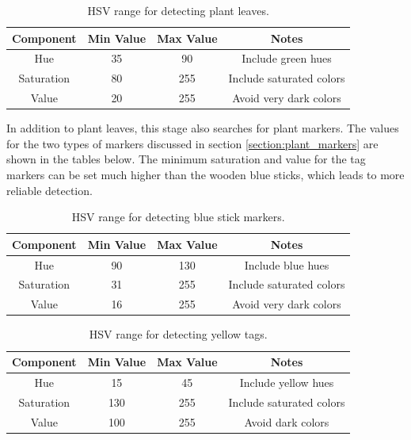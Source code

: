 \begin{table}
    \begin{center}
    \caption[Plant Leaf Detection Values]{HSV range for detecting plant leaves.}
    \begin{tabular}[c]{|c|c|c|c|}
        \hline
        Component & Min Value & Max Value & Notes \\
        \hline
        Hue        & 35  & 90  & Include green hues        \\
        Saturation & 80  & 255 & Include saturated colors  \\
        Value      & 20  & 255 & Avoid very dark colors    \\
        \hline
    \end{tabular}
    \label{table:plant_leaves_hsv_ranges}
   \end{center}
\end{table}

In addition to plant leaves, this stage also searches for plant markers.  The values for the two types of markers discussed in section \ref{section:plant_markers} are shown in the tables below.  The minimum saturation and value for the tag markers can be set much higher than the wooden blue sticks, which leads to more reliable detection.   

\begin{table}
    \begin{center}
    \caption[Blue Stick Detection Values]{HSV range for detecting blue stick markers.}
    \begin{tabular}[c]{|c|c|c|c|}
        \hline
        Component & Min Value & Max Value & Notes \\
        \hline
        Hue        & 90  & 130 & Include blue hues        \\
        Saturation & 31  & 255 & Include saturated colors  \\
        Value      & 16  & 255 & Avoid very dark colors    \\
        \hline
    \end{tabular}
    \label{table:stick_hsv_ranges}
   \end{center}
\end{table}

\begin{table}
    \begin{center}
    \caption[Yellow Tags Detection Values]{HSV range for detecting yellow tags.}
    \begin{tabular}[c]{|c|c|c|c|}
        \hline
        Component & Min Value & Max Value & Notes \\
        \hline
        Hue        & 15  & 45  & Include yellow hues       \\
        Saturation & 130 & 255 & Include saturated colors  \\
        Value      & 100 & 255 & Avoid dark colors         \\
        \hline
    \end{tabular}
    \label{table:stick_hsv_ranges}
   \end{center}
\end{table}

